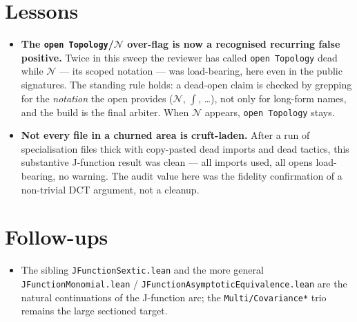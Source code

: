 \documentclass[11pt]{article}
\begin{document}
\section{Lessons}
\begin{itemize}[noitemsep]
  \item \textbf{The \texttt{open Topology}/$\mathcal N$ over-flag is now a recognised recurring false positive.}
    Twice in this sweep the reviewer has called \texttt{open Topology} dead while $\mathcal N$ --- its scoped
    notation --- was load-bearing, here even in the public signatures. The standing rule holds: a dead-open
    claim is checked by grepping for the \emph{notation} the open provides ($\mathcal N$, $\int$, \dots), not
    only for long-form names, and the build is the final arbiter. When $\mathcal N$ appears, \texttt{open
    Topology} stays.
  \item \textbf{Not every file in a churned area is cruft-laden.} After a run of specialisation files thick
    with copy-pasted dead imports and dead tactics, this substantive J-function result was clean --- all
    imports used, all opens load-bearing, no warning. The audit value here was the fidelity confirmation of a
    non-trivial DCT argument, not a cleanup.
\end{itemize}

\section{Follow-ups}
\begin{itemize}[noitemsep]
  \item The sibling \texttt{JFunctionSextic.lean} and the more general \texttt{JFunctionMonomial.lean} /
    \texttt{JFunctionAsymptoticEquivalence.lean} are the natural continuations of the J-function arc; the
    \texttt{Multi/Covariance*} trio remains the large sectioned target.
\end{itemize}
\end{document}
